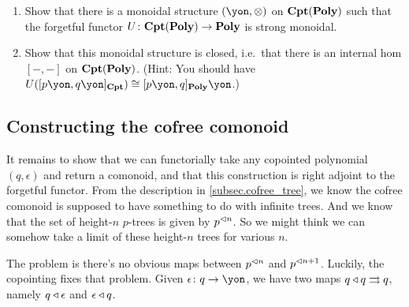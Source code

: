 \documentclass[Book-Poly]{subfiles}
\begin{document}
\begin{exercise}
\begin{enumerate}
	\item Show that there is a monoidal structure $(\yon,\otimes)$ on $\mathbf{Cpt}(\mathbf{Poly})$ such that the forgetful functor $U\colon\mathbf{Cpt}(\mathbf{Poly})\to\mathbf{Poly}$ is strong monoidal.
	\item Show that this monoidal structure is closed, i.e.\ that there is an internal hom $[-,-]$ on $\mathbf{Cpt}(\mathbf{Poly})$.
	(Hint: You should have $U([p\yon,q\yon]_{\Cat{Cpt}})\cong[p\yon,q]_{\poly}\yon$.)
\qedhere
\end{enumerate}
\end{exercise}

\subsection{Constructing the cofree comonoid}

It remains to show that we can functorially take any copointed polynomial $(q,\epsilon)$ and return a comonoid, and that this construction is right adjoint to the forgetful functor. From the description in \cref{subsec.cofree_tree}, we know the cofree comonoid is supposed to have something to do with infinite trees. And we know that the set of height-$n$ $p$-trees is given by $p^{\lhd n}$. So we might think we can somehow take a limit of these height-$n$ trees for various $n$. 

The problem is there's no obvious maps between $p^{\lhd n}$ and $p^{\lhd n+1}$. Luckily, the copointing fixes that problem. Given $\epsilon\colon q\to\yon$, we have two maps $q\mathbin{\triangleleft} q\rightrightarrows q$, namely $q\mathbin{\triangleleft}\epsilon$ and $\epsilon\mathbin{\triangleleft} q$.
\end{document}
